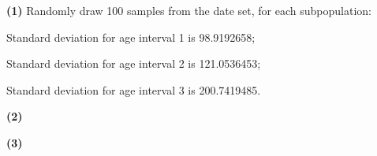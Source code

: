 \documentclass[11pt]{article}
\renewcommand\part[1]{\vspace{.10in}\textbf{(#1)}}
\begin{document}
\part{1} 
Randomly draw 100 samples from the date set, for each subpopulation:

Standard deviation for age interval 1 is 98.9192658;

Standard deviation for age interval 2 is 121.0536453;

Standard deviation for age interval 3 is 200.7419485.

\part{2}



\part{3} 
\end{document}

